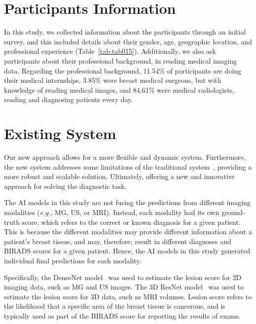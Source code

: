 \section{Participants Information}
\label{sec:app001003}

In this study, we collected information about the participants through an initial survey, and this included details about their gender, age, geographic location, and professional experience (Table~\ref{tab:tab015}).
Additionally, we also ask participants about their professional background, in reading medical imaging data.
Regarding the professional background, 11.54\% of participants are doing their medical internships, 3.85\% were breast medical surgeons, but with knowledge of reading medical images, and 84.61\% were medical radiologists, reading and diagnosing patients every day.



\section{Existing System}
\label{sec:app001004}

Our new approach allows for a more flexible and dynamic system.
Furthermore, the new system addresses some limitations of the traditional system~\cite{CALISTO2022102285}, providing a more robust and scalable solution.
Ultimately, offering a new and innovative approach for solving the diagnostic task.

The AI models in this study are not fusing the predictions from different imaging modalities ({\it e.g.}, MG, US, or MRI).
Instead, each modality had its own ground-truth score, which refers to the correct or known diagnosis for a given patient.
This is because the different modalities may provide different information about a patient's breast tissue, and may, therefore; result in different diagnoses and BIRADS scores for a given patient.
Hence, the AI models in this study generated individual final predictions for each modality.

Specifically, the DenseNet model~\cite{8721151} was used to estimate the lesion score for 2D imaging data, such as MG and US images.
The 3D ResNet model~\cite{Aldoj2020} was used to estimate the lesion score for 3D data, such as MRI volumes.
Lesion score refers to the likelihood that a specific area of the breast tissue is cancerous, and is typically used as part of the BIRADS score for reporting the results of exams.


